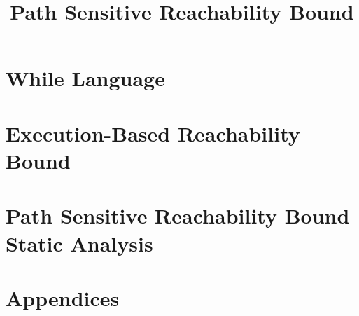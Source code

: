 \documentclass[a4paper,11pt]{article}
\newcommand{\highlight}[1]{\textcolor[rgb]{.0,0.0,1.0}{ #1}}
\begin{document}
\title{Path Sensitive Reachability Bound}

\author{}

\date{}

\maketitle
%
\tableofcontents

% 
\section{{While Language}}
\label{sec:language}

\clearpage
% 
% 
\section{\highlight{Execution-Based Reachability Bound}}
\label{sec:execution_rb}

\clearpage
\section{Path Sensitive Reachability Bound Static Analysis }
\label{sec:static_pathsensitiverb}



%
% 
%
\clearpage
\appendix
{}
\section*{Appendices}

\end{document}
